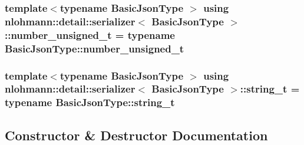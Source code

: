 \subsubsection[{\texorpdfstring{number\+\_\+unsigned\+\_\+t}{number_unsigned_t}}]{\setlength{\rightskip}{0pt plus 5cm}template$<$typename Basic\+Json\+Type $>$ using {\bf nlohmann\+::detail\+::serializer}$<$ Basic\+Json\+Type $>$\+::{\bf number\+\_\+unsigned\+\_\+t} =  typename Basic\+Json\+Type\+::number\+\_\+unsigned\+\_\+t\hspace{0.3cm}{\ttfamily [private]}}\hypertarget{classnlohmann_1_1detail_1_1serializer_a16c7b7a726a38ff0c06dce7ba7968391}{}\label{classnlohmann_1_1detail_1_1serializer_a16c7b7a726a38ff0c06dce7ba7968391}
\subsubsection[{\texorpdfstring{string\+\_\+t}{string_t}}]{\setlength{\rightskip}{0pt plus 5cm}template$<$typename Basic\+Json\+Type $>$ using {\bf nlohmann\+::detail\+::serializer}$<$ Basic\+Json\+Type $>$\+::{\bf string\+\_\+t} =  typename Basic\+Json\+Type\+::string\+\_\+t\hspace{0.3cm}{\ttfamily [private]}}\hypertarget{classnlohmann_1_1detail_1_1serializer_ad08aa54fac1dd0a453320c54137d45ba}{}\label{classnlohmann_1_1detail_1_1serializer_ad08aa54fac1dd0a453320c54137d45ba}


\subsection{Constructor \& Destructor Documentation}
